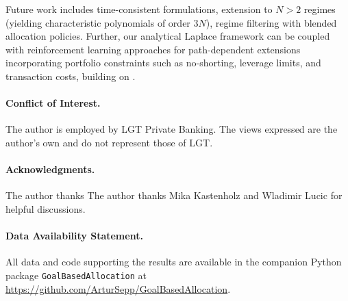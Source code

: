 \documentclass[11pt,a4paper]{article}
\numberwithin{equation}{section}
\begin{document}
Future work includes time-consistent formulations, extension to $N > 2$ regimes (yielding characteristic polynomials of order $3N$), regime filtering with blended allocation policies. Further, our analytical Laplace framework can be coupled with reinforcement learning approaches for path-dependent extensions incorporating portfolio constraints such as no-shorting, leverage limits, and transaction costs, building on \citep{DangForsyth2014, WangZhou2020}.


\paragraph{Conflict of Interest.}
The author is employed by LGT Private Banking. The views expressed 
are the author's own and do not represent those of LGT.


\paragraph{Acknowledgments.}
The author thanks The author thanks Mika Kastenholz and Wladimir Lucic for helpful discussions.


\paragraph{Data Availability Statement.}
All data and code supporting the results are available in the 
companion Python package \texttt{GoalBasedAllocation} at 
\url{https://github.com/ArturSepp/GoalBasedAllocation}.
\end{document}
